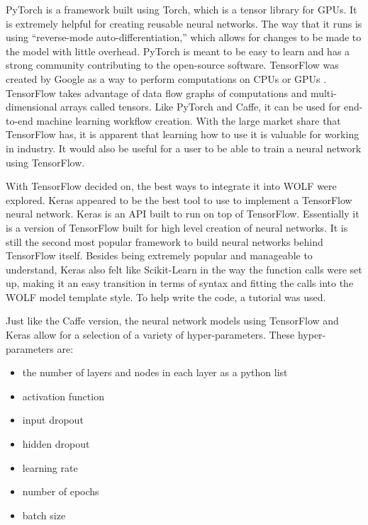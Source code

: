 PyTorch \parencite{PyTorch} is a framework built using Torch, which is a tensor library for GPUs. It is extremely helpful for creating reusable neural networks. The way that it runs is using ``reverse-mode auto-differentiation,'' which allows for changes to be made to the model with little overhead. PyTorch is meant to be easy to learn and has a strong community contributing to the open-source software. TensorFlow was created by Google as a way to perform computations on CPUs or GPUs \parencite{TensorFlow}. TensorFlow takes advantage of data flow graphs of computations and multi-dimensional arrays called tensors. Like PyTorch and Caffe, it can be used for end-to-end machine learning workflow creation. With the large market share that TensorFlow has, it is apparent that learning how to use it is valuable for working in industry. It would also be useful for a user to be able to train a neural network using TensorFlow.

With TensorFlow decided on, the best ways to integrate it into WOLF were explored. Keras appeared to be the best tool to use to implement a TensorFlow neural network. Keras \parencite{keras} is an API built to run on top of TensorFlow. Essentially it is a version of TensorFlow built for high level creation of neural networks. It is still the second most popular framework to build neural networks behind TensorFlow itself. Besides being extremely popular and manageable to understand, Keras also felt like Scikit-Learn \parencite{sklearn} in the way the function calls were set up, making it an easy transition in terms of syntax and fitting the calls into the WOLF model template style. To help write the code, a tutorial \parencite{KerasTutorial} was used.

Just like the Caffe version, the neural network models using TensorFlow and Keras allow for a selection of a variety of hyper-parameters. These hyper-parameters are:
\begin{itemize}
	\item the number of layers and nodes in each layer as a python list
	\item activation function
	\item input dropout
	\item hidden dropout
	\item learning rate
	\item number of epochs
	\item batch size
\end{itemize}



